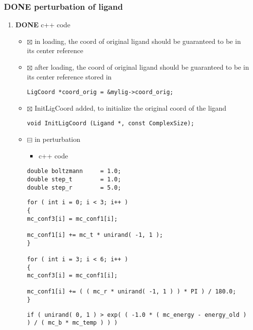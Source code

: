 \documentclass[11pt]{article}
\begin{document}
\subsubsection{{\bfseries\sffamily DONE} perturbation of ligand}
\label{sec-2-2-1}
\begin{enumerate}
\item {\bfseries\sffamily DONE} c++ code
\label{sec-2-2-1-1}
\begin{itemize}
\item $\boxtimes$ in loading, the coord of original ligand should be guaranteed to be in its center reference
\item $\boxtimes$ after loading, the coord of original ligand should be guaranteed to be in its center reference
stored in
\begin{verbatim}
LigCoord *coord_orig = &mylig->coord_orig;
\end{verbatim}
\item $\boxtimes$ InitLigCoord added, to initialize the original coord of the ligand
\begin{verbatim}
void InitLigCoord (Ligand *, const ComplexSize);
\end{verbatim}
\item $\boxminus$ in perturbation
\begin{itemize}
\item c++ code
\end{itemize}
\begin{verbatim}
double boltzmann     = 1.0;
double step_t        = 1.0;
double step_r        = 5.0;
\end{verbatim}
\begin{verbatim}
for ( int i = 0; i < 3; i++ )
{
mc_conf3[i] = mc_conf1[i];

mc_conf1[i] += mc_t * unirand( -1, 1 );
}

for ( int i = 3; i < 6; i++ )
{
mc_conf3[i] = mc_conf1[i];

mc_conf1[i] += ( ( mc_r * unirand( -1, 1 ) ) * PI ) / 180.0;
}
\end{verbatim}
\begin{verbatim}
if ( unirand( 0, 1 ) > exp( ( -1.0 * ( mc_energy - energy_old ) ) / ( mc_b * mc_temp ) ) )
\end{verbatim}
\end{itemize}


\end{enumerate}
\end{document}
